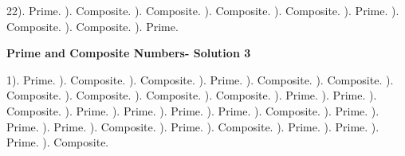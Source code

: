 \documentclass{article}%
\begin{document}
22). Prime.%
). Composite.%
). Composite.%
). Composite.%
). Composite.%
). Prime.%
). Composite.%
). Composite.%
). Prime.%
\newline%
\newpage%
\large%
\begin{center}%
\textbf{Prime and Composite Numbers- Solution 3}%
\newline%
\end{center} \normalsize%
1). Prime.%
). Composite.%
). Composite.%
). Prime.%
). Composite.%
). Composite.%
). Composite.%
). Composite.%
). Composite.%
). Composite.%
). Prime.%
). Prime.%
). Composite.%
). Prime.%
). Prime.%
). Prime.%
). Prime.%
). Composite.%
). Prime.%
). Prime.%
). Prime.%
). Composite.%
). Prime.%
). Composite.%
). Prime.%
). Prime.%
). Prime.%
). Composite.%
\newline%
\end{document}
